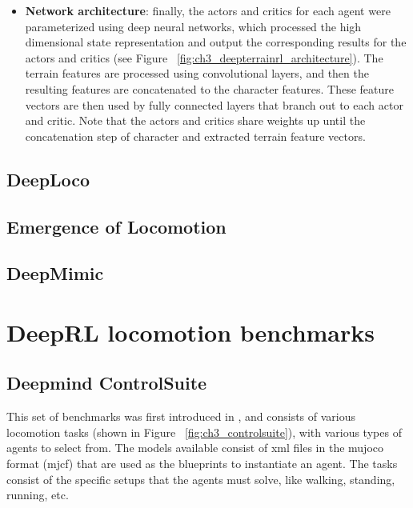 \begin{itemize}
    \item \textbf{Network architecture}: finally, the actors and critics for each
          agent were parameterized using deep neural networks, which processed the
          high dimensional state representation and output the corresponding results
          for the actors and critics (see Figure ~\ref{fig:ch3_deepterrainrl_architecture}).
          The terrain features are processed using convolutional layers, and then
          the resulting features are concatenated to the character features. These
          feature vectors are then used by fully connected layers that branch out
          to each actor and critic. Note that the actors and critics share weights
          up until the concatenation step of character and extracted terrain feature vectors.

          \figDeepTerrainRLArchitecture

\end{itemize}

\subsection{DeepLoco}


\subsection{Emergence of Locomotion}


\subsection{DeepMimic}

\newpage

\section{DeepRL locomotion benchmarks}

\subsection{Deepmind ControlSuite}

This set of benchmarks was first introduced in \cite{Controlsuite}, and consists 
of various locomotion tasks (shown in Figure ~\ref{fig:ch3_controlsuite}), with various types of agents 
to select from. The models available consist of xml files in the mujoco format (mjcf) 
that are used as the blueprints to instantiate an agent. The tasks consist of the specific
setups that the agents must solve, like walking, standing, running, etc.


